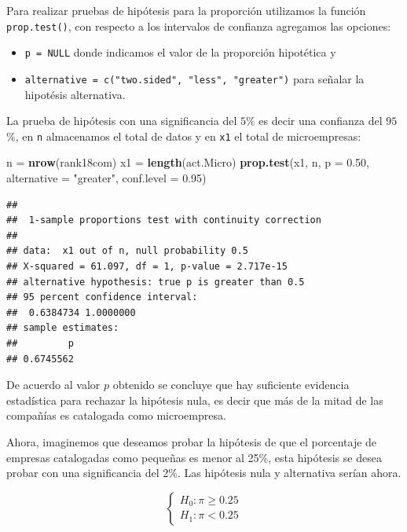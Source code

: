 \documentclass[letterpaper,]{book}
\newenvironment{Shaded}{\begin{snugshade}}{\end{snugshade}}
\newcommand{\DataTypeTok}[1]{\textcolor[rgb]{0.13,0.29,0.53}{#1}}
\newcommand{\FloatTok}[1]{\textcolor[rgb]{0.00,0.00,0.81}{#1}}
\newcommand{\KeywordTok}[1]{\textcolor[rgb]{0.13,0.29,0.53}{\textbf{#1}}}
\newcommand{\NormalTok}[1]{#1}
\newcommand{\StringTok}[1]{\textcolor[rgb]{0.31,0.60,0.02}{#1}}
\providecommand{\tightlist}{%
  \setlength{\itemsep}{0pt}\setlength{\parskip}{0pt}}
\begin{document}
Para realizar pruebas de hipótesis para la proporción utilizamos la función \texttt{prop.test()}, con respecto a los intervalos de confianza agregamos las opciones:

\begin{itemize}
\tightlist
\item
  \texttt{p\ =\ NULL} donde indicamos el valor de la proporción hipotética y
\item
  \texttt{alternative\ =\ c("two.sided",\ "less",\ "greater")} para señalar la hipotésis alternativa.
\end{itemize}

La prueba de hipótesis con una significancia del \(5\%\) es decir una confianza del \(95\)\%, en \texttt{n} almacenamos el total de datos y en \texttt{x1} el total de microempresas:

\begin{Shaded}
\begin{Highlighting}[]
\NormalTok{n =}\StringTok{ }\KeywordTok{nrow}\NormalTok{(rank18com)}
\NormalTok{x1 =}\StringTok{ }\KeywordTok{length}\NormalTok{(act.Micro)}
\KeywordTok{prop.test}\NormalTok{(x1, n, }\DataTypeTok{p =} \FloatTok{0.50}\NormalTok{, }\DataTypeTok{alternative =} \StringTok{"greater"}\NormalTok{,  }\DataTypeTok{conf.level =} \FloatTok{0.95}\NormalTok{)}
\end{Highlighting}
\end{Shaded}

\begin{verbatim}
## 
##  1-sample proportions test with continuity correction
## 
## data:  x1 out of n, null probability 0.5
## X-squared = 61.097, df = 1, p-value = 2.717e-15
## alternative hypothesis: true p is greater than 0.5
## 95 percent confidence interval:
##  0.6384734 1.0000000
## sample estimates:
##         p 
## 0.6745562
\end{verbatim}

De acuerdo al valor \(p\) obtenido se concluye que hay suficiente evidencia estadística para rechazar la hipótesis nula, es decir que más de la mitad de las compañías es catalogada como microempresa.

Ahora, imaginemos que deseamos probar la hipótesis de que el porcentaje de empresas catalogadas como pequeñas es menor al 25\%, esta hipótesis se desea probar con una significancia del 2\%. Las hipótesis nula y alternativa serían ahora.

\begin{equation} 
\begin{cases} 
H_0: \pi \geq 0.25 \\ 
H_1: \pi < 0.25
\end{cases} 
\end{equation}
\end{document}
